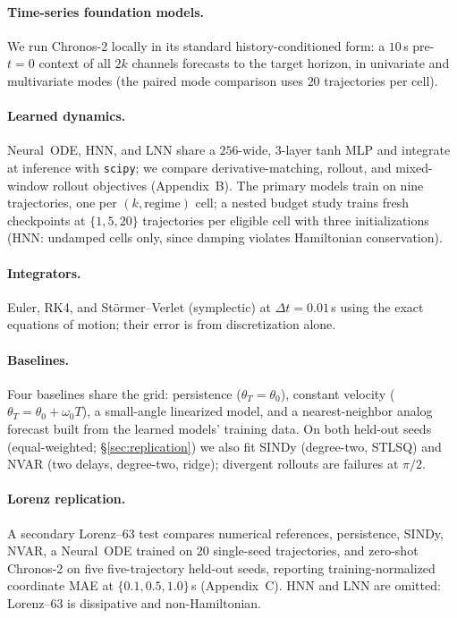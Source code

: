\documentclass{article}
\begin{document}
\paragraph{Time-series foundation models.} We run Chronos-2 \citep{ansari2024chronos}
locally in its standard history-conditioned form: a $10$\,s pre-$t{=}0$ context of all $2k$
channels forecasts to the target horizon, in univariate and multivariate modes (the paired
mode comparison uses $20$ trajectories per cell).

\paragraph{Learned dynamics.} Neural~ODE, HNN, and LNN share a $256$-wide, $3$-layer tanh
MLP and integrate at inference with \texttt{scipy}; we compare derivative-matching, rollout, and
mixed-window rollout objectives (Appendix~B). The primary models train on nine trajectories,
one per $(k,\mathrm{regime})$ cell; a nested budget study trains fresh checkpoints at $\{1,5,20\}$
trajectories per eligible cell with three initializations (HNN: undamped cells only, since
damping violates Hamiltonian conservation).

\paragraph{Integrators.} Euler, RK4, and St\"ormer--Verlet (symplectic) at $\Delta
t{=}0.01$\,s using the exact equations of motion; their error is from discretization alone.

\paragraph{Baselines.} Four baselines share the grid: persistence
($\theta_T{=}\theta_0$), constant velocity ($\theta_T{=}\theta_0{+}\omega_0T$), a
small-angle linearized model, and a nearest-neighbor analog forecast built from the learned
models' training data. On both held-out seeds (equal-weighted; \S\ref{sec:replication}) we
also fit SINDy (degree-two, STLSQ) and NVAR (two delays, degree-two, ridge); divergent
rollouts are failures at $\pi/2$.

\paragraph{Lorenz replication.} A secondary Lorenz--63 test compares numerical references,
persistence, SINDy, NVAR, a Neural~ODE trained on $20$ single-seed trajectories, and zero-shot
Chronos-2 on five five-trajectory held-out seeds, reporting training-normalized coordinate MAE
at $\{0.1,0.5,1.0\}$\,s (Appendix~C). HNN and LNN are omitted:
Lorenz--63 is dissipative and non-Hamiltonian.
\end{document}
